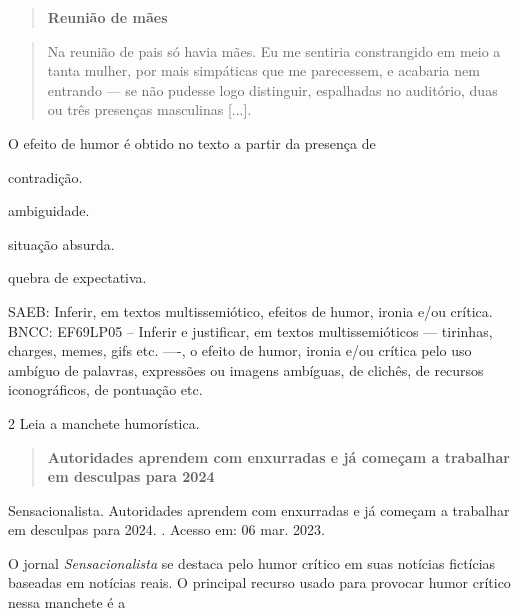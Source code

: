 \begin{quote}
\textbf{Reunião de mães}
\end{quote}

\begin{quote}
Na reunião de pais só havia mães. Eu me sentiria constrangido em meio a
tanta mulher, por mais simpáticas que me parecessem, e acabaria nem
entrando --- se não pudesse logo distinguir, espalhadas no auditório,
duas ou três presenças masculinas {[}...{]}.
\end{quote}


O efeito de humor é obtido no texto a partir da presença de

\begin{escolha}
\item contradição.

\item ambiguidade.

\item situação absurda.

\item quebra de expectativa.
\end{escolha}

SAEB: Inferir, em textos multissemiótico, efeitos de humor, ironia e/ou
crítica. BNCC: EF69LP05 -- Inferir e justificar, em textos
multissemióticos --- tirinhas, charges, memes, gifs etc. ----, o efeito
de humor, ironia e/ou crítica pelo uso ambíguo de palavras, expressões
ou imagens ambíguas, de clichês, de recursos iconográficos, de pontuação
etc.

\num{2} Leia a manchete humorística.

\begin{quote}
\textbf{Autoridades aprendem com enxurradas e já começam a trabalhar em
desculpas para 2024}
\end{quote}

Sensacionalista. Autoridades aprendem com enxurradas e já começam a
trabalhar em desculpas para 2024. .%
Acesso em: 06 mar. 2023.

O jornal \emph{Sensacionalista} se destaca pelo humor crítico em suas
notícias fictícias baseadas em notícias reais. O principal recurso usado
para provocar humor crítico nessa manchete é a

